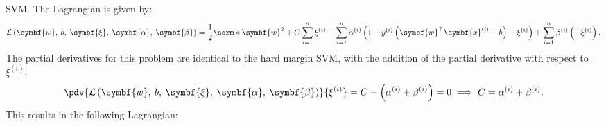\documentclass{article}
\begin{document}
SVM. The Lagrangian is given by:
\begin{equation*}
    \mathcal{L}\left( \symbf{w},\: b,\: \symbf{\xi},\: \symbf{\alpha},\: \symbf{\beta} \right) = \frac{1}{2}\norm*{\symbf{w}}^2 + C \sum_{i = 1}^n \xi^{\left( i \right)} + \sum_{i = 1}^n \alpha^{\left( i \right)} \left( 1 - y^{\left( i \right)} \left( \symbf{w}^\top \symbf{x}^{\left( i \right)} - b \right) - \xi^{\left( i \right)} \right) + \sum_{i = 1}^n \beta^{\left( i \right)} \left( -\xi^{\left( i \right)} \right).
\end{equation*}
The partial derivatives for this problem are identical to the hard
margin SVM, with the addition of the partial derivative with respect to
\(\xi^{\left( i \right)}\):
\begin{equation*}
    \pdv{\mathcal{L}\left( \symbf{w},\: b,\: \symbf{\xi},\: \symbf{\alpha},\: \symbf{\beta} \right)}{\xi^{\left( i \right)}} = C - \left( \alpha^{\left( i \right)} + \beta^{\left( i \right)} \right) = 0 \implies C = \alpha^{\left( i \right)} + \beta^{\left( i \right)}.
\end{equation*}
This results in the following Lagrangian:
\end{document}
